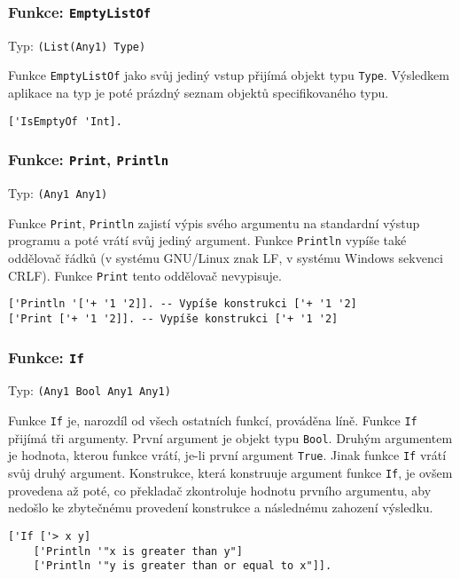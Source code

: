 \subsubsection*{Funkce: \lstinline|EmptyListOf|}
Typ: \lstinline{(List(Any1) Type)}

Funkce \lstinline{EmptyListOf} jako svůj jediný vstup přijímá objekt typu \lstinline{Type}.
Výsledkem aplikace na typ je poté prázdný seznam objektů specifikovaného typu.

\begin{lstlisting}[caption={Ukázka využití EmptyListOf}]
['IsEmptyOf 'Int].
\end{lstlisting}

\subsubsection*{Funkce: \lstinline|Print|, \lstinline{Println}}
Typ: \lstinline{(Any1 Any1)}

Funkce \lstinline{Print}, \lstinline{Println} zajistí výpis svého argumentu na standardní výstup
programu a poté vrátí svůj jediný argument. Funkce \lstinline{Println} vypíše také oddělovač řádků
(v systému GNU/Linux znak LF, v systému Windows sekvenci CRLF). Funkce \lstinline{Print} tento
oddělovač nevypisuje.

\begin{lstlisting}[caption={Ukázka využití Print, Println}]
['Println '['+ '1 '2]]. -- Vypíše konstrukci ['+ '1 '2]
['Print ['+ '1 '2]]. -- Vypíše konstrukci ['+ '1 '2]
\end{lstlisting}

\subsubsection*{Funkce: \lstinline{If}}
Typ: \lstinline{(Any1 Bool Any1 Any1)}

Funkce \lstinline{If} je, narozdíl od všech ostatních funkcí, prováděna líně. Funkce \lstinline{If}
přijímá tři argumenty. První argument je objekt typu \lstinline{Bool}. Druhým argumentem je hodnota,
kterou funkce vrátí, je-li první argument \lstinline{True}. Jinak funkce \lstinline{If} vrátí svůj
druhý argument. Konstrukce, která konstruuje argument funkce \lstinline{If}, je ovšem provedena až
poté, co překladač zkontroluje hodnotu prvního argumentu, aby nedošlo ke zbytečnému provedení
konstrukce a následnému zahození výsledku.

\begin{lstlisting}[caption={Ukázka využití If}]
['If ['> x y]
    ['Println '"x is greater than y"]
    ['Println '"y is greater than or equal to x"]].
\end{lstlisting}

